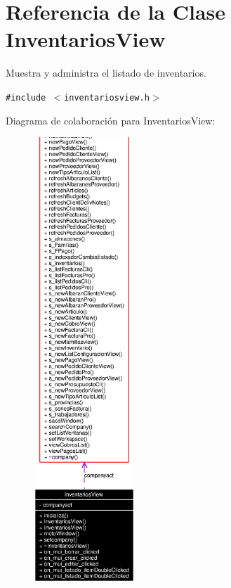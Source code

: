 \section{Referencia de la Clase Inventarios\-View}
\label{classInventariosView}
Muestra y administra el listado de inventarios.  


{\tt \#include $<$inventariosview.h$>$}

Diagrama de colaboraci\'{o}n para Inventarios\-View:\begin{figure}[H]
\begin{center}
\leavevmode
\includegraphics[width=108pt]{classInventariosView__coll__graph}
\end{center}
\end{figure}
